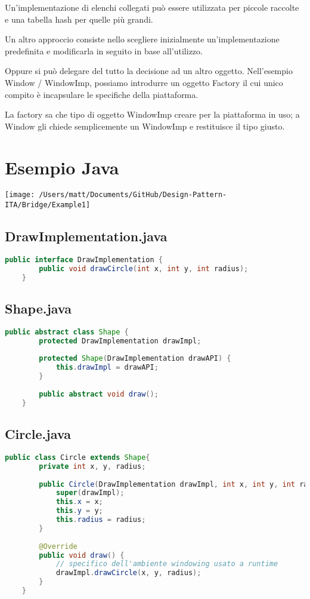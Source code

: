 Un'implementazione di elenchi collegati può essere utilizzata per piccole raccolte e una tabella hash per quelle più grandi.

Un altro approccio consiste nello scegliere inizialmente un'implementazione predefinita e modificarla in seguito in base all'utilizzo.

Oppure si può delegare del tutto la decisione ad un altro oggetto. Nell'esempio Window / WindowImp, possiamo introdurre un oggetto Factory il cui unico compito è incapsulare le specifiche della piattaforma.

La factory sa che tipo di oggetto WindowImp creare per la piattaforma in uso; a Window gli chiede semplicemente un WindowImp e restituisce il tipo giusto.


\section{Esempio Java}
\texttt{[image: /Users/matt/Documents/GitHub/Design-Pattern-ITA/Bridge/Example1]}

\subsection{DrawImplementation.java}
\begin{lstlisting}[language=java]
    public interface DrawImplementation {
        public void drawCircle(int x, int y, int radius);
    }
\end{lstlisting}

\subsection{Shape.java}
\begin{lstlisting}[language=java]
    public abstract class Shape {
        protected DrawImplementation drawImpl;
    
        protected Shape(DrawImplementation drawAPI) {
            this.drawImpl = drawAPI;
        }
    
        public abstract void draw();
    }
\end{lstlisting}

\subsection{Circle.java}
\begin{lstlisting}[language=java]
    public class Circle extends Shape{
        private int x, y, radius;
    
        public Circle(DrawImplementation drawImpl, int x, int y, int radius) {
            super(drawImpl);
            this.x = x;
            this.y = y;
            this.radius = radius;
        }
    
        @Override
        public void draw() {
            // specifico dell'ambiente windowing usato a runtime
            drawImpl.drawCircle(x, y, radius);
        }
    }
\end{lstlisting}

